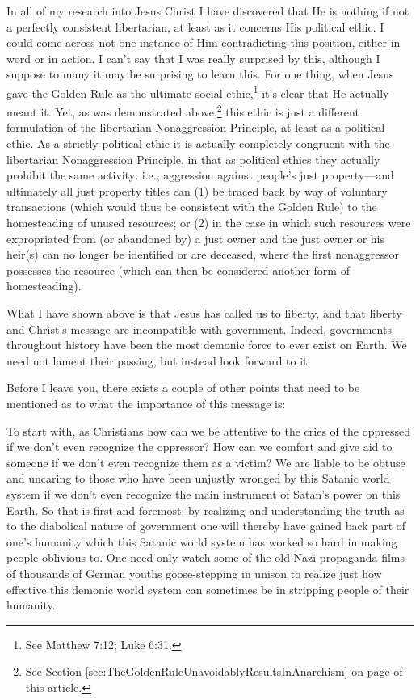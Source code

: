 \documentclass[letterpaper,12pt]{article}
\begin{document}
\noindent
In all of my research into Jesus Christ I have discovered that He is nothing if not a perfectly consistent libertarian, at least as it concerns His political ethic. I could come across not one instance of Him contradicting this position, either in word or in action. I can't say that I was really surprised by this, although I suppose to many it may be surprising to learn this. For one thing, when Jesus gave the Golden Rule as the ultimate social ethic,\footnote{See Matthew 7:12; Luke 6:31.} it's clear that He actually meant it. Yet, as was demonstrated above,\footnote{See Section \ref{sec:TheGoldenRuleUnavoidablyResultsInAnarchism} on page \pageref{sec:TheGoldenRuleUnavoidablyResultsInAnarchism} of this article.} this ethic is just a different formulation of the libertarian Nonaggression Principle, at least as a political ethic. As a strictly political ethic it is actually completely congruent with the libertarian Nonaggression Principle, in that as political ethics they actually prohibit the same activity: i.e., aggression against people's just property---and ultimately all just property titles can (1) be traced back by way of voluntary transactions (which would thus be consistent with the Golden Rule) to the homesteading of unused resources; or (2) in the case in which such resources were expropriated from (or abandoned by) a just owner and the just owner or his heir(s) can no longer be identified or are deceased, where the first nonaggressor possesses the resource (which can then be considered another form of homesteading).

What I have shown above is that Jesus has called us to liberty, and that liberty and Christ's message are incompatible with government. Indeed, governments throughout history have been the most demonic force to ever exist on Earth. We need not lament their passing, but instead look forward to it.

Before I leave you, there exists a couple of other points that need to be mentioned as to what the importance of this message is:

To start with, as Christians how can we be attentive to the cries of the oppressed if we don't even recognize the oppressor? How can we comfort and give aid to someone if we don't even recognize them as a victim? We are liable to be obtuse and uncaring to those who have been unjustly wronged by this Satanic world system if we don't even recognize the main instrument of Satan's power on this Earth. So that is first and foremost: by realizing and understanding the truth as to the diabolical nature of government one will thereby have gained back part of one's humanity which this Satanic world system has worked so hard in making people oblivious to. One need only watch some of the old Nazi propaganda films of thousands of German youths goose-stepping in unison to realize just how effective this demonic world system can sometimes be in stripping people of their humanity.
\end{document}
